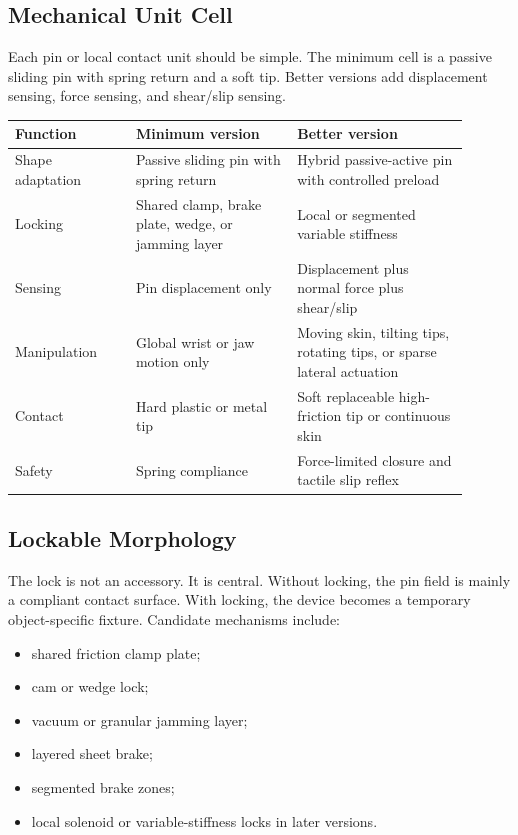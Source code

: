 \documentclass[11pt]{article}
\begin{document}
\subsection{Mechanical Unit Cell}

Each pin or local contact unit should be simple. The minimum cell is a passive sliding pin with spring return and a soft tip. Better versions add displacement sensing, force sensing, and shear/slip sensing.

\begin{longtable}{L{0.24\linewidth} L{0.32\linewidth} L{0.34\linewidth}}
\toprule
\textbf{Function} & \textbf{Minimum version} & \textbf{Better version} \\
\midrule
\endhead
Shape adaptation & Passive sliding pin with spring return & Hybrid passive-active pin with controlled preload \\
Locking & Shared clamp, brake plate, wedge, or jamming layer & Local or segmented variable stiffness \\
Sensing & Pin displacement only & Displacement plus normal force plus shear/slip \\
Manipulation & Global wrist or jaw motion only & Moving skin, tilting tips, rotating tips, or sparse lateral actuation \\
Contact & Hard plastic or metal tip & Soft replaceable high-friction tip or continuous skin \\
Safety & Spring compliance & Force-limited closure and tactile slip reflex \\
\bottomrule
\end{longtable}

\subsection{Lockable Morphology}

The lock is not an accessory. It is central. Without locking, the pin field is mainly a compliant contact surface. With locking, the device becomes a temporary object-specific fixture. Candidate mechanisms include:

\begin{itemize}
  \item shared friction clamp plate;
  \item cam or wedge lock;
  \item vacuum or granular jamming layer;
  \item layered sheet brake;
  \item segmented brake zones;
  \item local solenoid or variable-stiffness locks in later versions.
\end{itemize}
\end{document}
